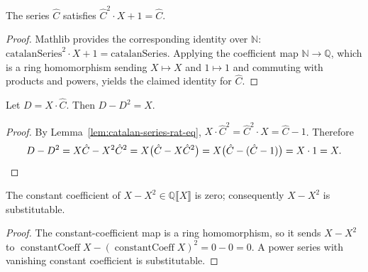 \begin{lemma}
    \label{lem:catalan-series-rat-eq}
    \leanok
    The series $\hat C$ satisfies $\hat C^2 \cdot X + 1 = \hat C$.
\end{lemma}
\begin{proof}
    Mathlib provides the corresponding identity over $\mathbb{N}$:
    $\mathrm{catalanSeries}^2 \cdot X + 1 = \mathrm{catalanSeries}$. Applying the coefficient
    map $\mathbb{N} \to \mathbb{Q}$, which is a ring homomorphism sending $X \mapsto X$ and
    $1 \mapsto 1$ and commuting with products and powers, yields the claimed identity for
    $\hat C$.
\end{proof}

\begin{lemma}
    \label{lem:catalan-times-X-relation}
    \leanok
    Let $D = X \cdot \hat C$. Then $D - D^2 = X$.
\end{lemma}
\begin{proof}
    By Lemma~\ref{lem:catalan-series-rat-eq}, $X \cdot \hat C^2 = \hat C^2 \cdot X = \hat C - 1$.
    Therefore
    \[
      D - D^2 = X\hat C - X^2 \hat C^2 = X\bigl(\hat C - X \hat C^2\bigr)
              = X\bigl(\hat C - (\hat C - 1)\bigr) = X \cdot 1 = X. \qedhere
    \]
\end{proof}

\begin{lemma}[$X - X^2$ is substitutable]
    \label{lem:hasSubst-X-sub-X-sq}
    \leanok
    The constant coefficient of $X - X^2 \in \mathbb{Q}\llbracket X\rrbracket$ is zero;
    consequently $X - X^2$ is substitutable.
\end{lemma}
\begin{proof}
    The constant-coefficient map is a ring homomorphism, so it sends $X - X^2$ to
    $\operatorname{constantCoeff} X - (\operatorname{constantCoeff} X)^2 = 0 - 0 = 0$. A power
    series with vanishing constant coefficient is substitutable.
\end{proof}


